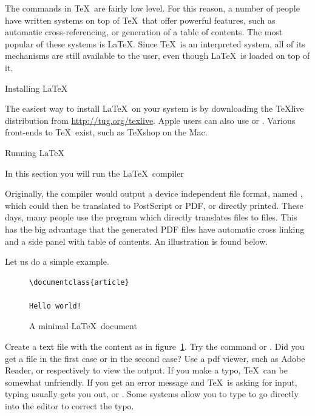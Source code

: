 The commands in \TeX\ are fairly low level. For this reason, a number
of people have written systems on top of \TeX\ that offer powerful
features, such as automatic cross-referencing, or generation of a
table of contents. The most popular of these systems is \LaTeX. Since
\TeX\ is an interpreted system, all of its mechanisms are still
available to the user, even though \LaTeX\ is loaded on top of it.


 {Installing \LaTeX}

The easiest way to install \LaTeX\ on your system is by downloading
the \TeX{}live distribution from \url{http://tug.org/texlive}. Apple
users can also use  or . Various front-ends to
\TeX\ exist, such as \TeX{}shop on the Mac.

 {Running \LaTeX}

\begin{purpose}
In this section you will run the \LaTeX\ compiler  
\end{purpose}

Originally, the  compiler would output a device independent
file format, named , which could then be translated to
PostScript or PDF, or directly printed. These days, many people use
the  program which directly translates  files to
 files. This has the big advantage that the generated PDF
files have automatic cross linking and a side panel with table of
contents. An illustration is found below.

Let us do a simple example.
\begin{figure}[ht]
\begin{verbatim}
\documentclass{article}

Hello world!

\end{verbatim}
  \caption{A minimal \LaTeX\ document}
  \label{fig:minimaldoc}
\end{figure}
\practical
{Create a text file  with the content as in
  figure~\ref{fig:minimaldoc}. Try the command  or
  . Did you get a file  in the first
  case or  in the second case? Use a pdf viewer, such
  as Adobe Reader, or
   respectively to view the output.}  
{}
{If you make a typo, \TeX\ can be somewhat unfriendly. If you get an
  error message and \TeX\ is asking for input, typing 
  usually gets you out, or . Some systems allow you to type
   to go directly into the editor to correct the typo.}

